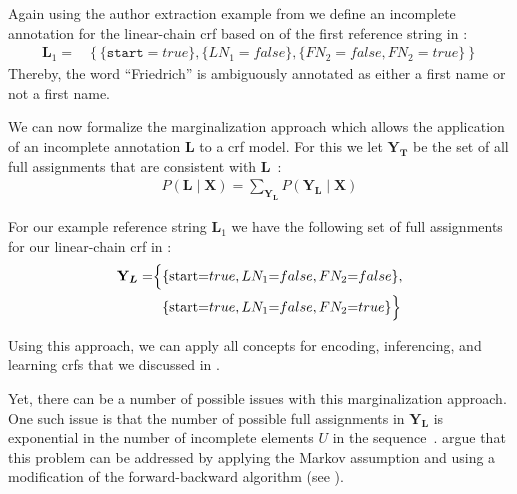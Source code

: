 Again using the author extraction example from  we define an incomplete annotation for the \gls{linear-chain crf} based on of the first reference string in :
\begin{equation*}
\begin{split}
  \bm{L}_1=&\left\{\{\texttt{start}{=}true\},\{LN_1{=}false\},\{FN_2{=}false,FN_2{=}true\}\right\}
\end{split}
\end{equation*}
Thereby, the word ``Friedrich'' is ambiguously annotated as either a first name or not a first name.

\bigskip

We can now formalize the marginalization approach which allows the application of an incomplete annotation $\bm{L}$ to a \gls{crf} model.
For this we let $\mathbf{Y}_{\bm{T}}$ be the set of all \glspl{full assignment} that are consistent with $\bm{L}$~\citep{tsuboi2008training}:
\begin{equation}
  \label{equ:crf-marginalization}
  \begin{split}
    P\left(\bm{L}\mid\mathbf{X}\right)=\sum_{\mathbf{Y}_{\bm{L}}}P\left(\mathbf{Y}_{\bm{L}}\mid\mathbf{X}\right)
  \end{split}
\end{equation}

For our example reference string $\bm{L}_1$ we have the following set of \glspl{full assignment} for our \gls{linear-chain crf} in :
\begin{equation*}
\begin{split}
  \mathbf{Y}_{\bm{L}}=&\Big\{\{\text{start}{=}true,LN_1{=}false,FN_2{=}false\},\\
  &\hphantom{\Big\{}\{\text{start}{=}true,LN_1{=}false,FN_2{=}true\}\Big\}\\
\end{split}
\end{equation*}

Using this approach, we can apply all concepts for encoding, inferencing, and learning \glspl{crf} that we discussed in .

\bigskip

Yet, there can be a number of possible issues with this marginalization approach.
One such issue is that the number of possible \glspl{full assignment} in $\mathbf{Y}_{\bm{L}}$ is exponential in the number of incomplete elements $U$ in the sequence~\citep{tsuboi2008training}.
\citep{tsuboi2008training} argue that this problem can be addressed by applying the Markov assumption and using a modification of the forward-backward algorithm (see ).

